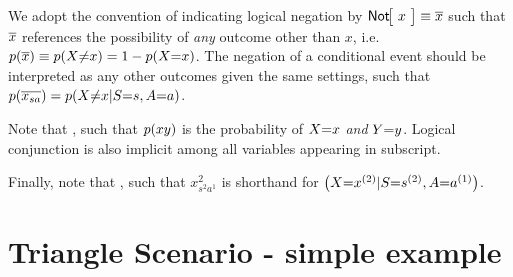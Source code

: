 




We adopt the convention of indicating logical negation by $\NamedFunction{Not}{\!x\!}\equiv\n{x}$ such that $\n{x}$ references the possibility of \emph{any} outcome other than $x$, i.e. $\p{\n{x}}\equiv\p{X\cramp{\neq}x}=1-\p{X\cramp{=}x}$. The negation of a conditional event should be interpreted as any other outcomes given the same settings, such that $\p{\n{x_{s a}}}=\p{X\cramp{\neq}x|S\cramp{=}s,A\cramp{=}a}$.

Note that , such that $\p{x y}$ is the probability of $X\cramp{=}x$ \emph{and} $Y\cramp{=}y$. Logical conjunction is also implicit among all variables appearing in subscript.

Finally, note that , such that $x^2_{s^2 a^1}$ is shorthand for $\parens*{X\cramp{=}x^{(2)}|S\cramp{=}s^{(2)},A\cramp{=}a^{(1)}}$. 



\section{Triangle Scenario - simple example}\label{sec:TriSimple}


